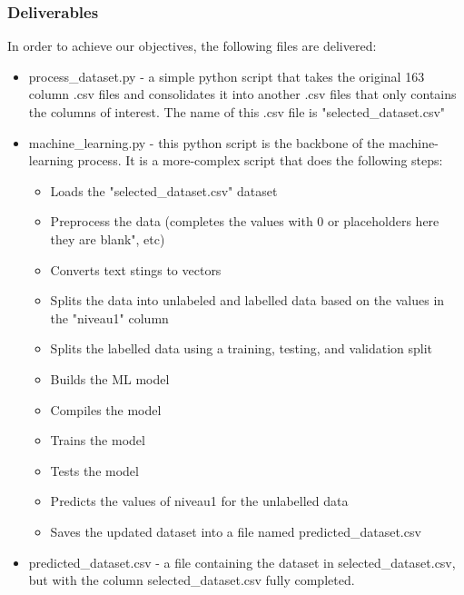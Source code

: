 \subsubsection{Deliverables}
In order to achieve our objectives, the following files are delivered: 
\begin{itemize}
    \item process\_dataset.py - a simple python script that takes the original 163 column .csv files and consolidates it into another .csv files that only contains the columns of interest. The name of this .csv file is "selected\_dataset.csv" 
    \item machine\_learning.py - this python script is the backbone of the machine-learning process. It is a more-complex script that does the following steps: 
        \begin{itemize}
            \item Loads the "selected\_dataset.csv" dataset
            \item Preprocess the data (completes the values with 0 or placeholders here they are blank", etc)
            \item Converts text stings to vectors
            \item Splits the data into unlabeled and labelled data based on the values in the "niveau1" column
            \item Splits the labelled data using a training, testing, and validation split
            \item Builds the ML model
            \item Compiles the model
            \item Trains the model
            \item Tests the model
            \item Predicts the values of niveau1 for the unlabelled data
            \item Saves the updated dataset into a file named predicted\_dataset.csv
        \end{itemize}
    \item predicted\_dataset.csv - a file containing the dataset in selected\_dataset.csv, but with the column selected\_dataset.csv fully completed. 
\end{itemize}
